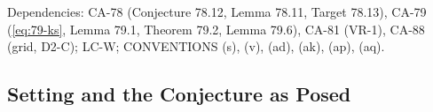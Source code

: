 Dependencies: CA-78 (Conjecture 78.12, Lemma 78.11, Target 78.13), CA-79 (\eqref{eq:79-ks}, Lemma 79.1, Theorem
79.2, Lemma 79.6), CA-81 (VR-1), CA-88 (grid, D2-C); LC-W; CONVENTIONS (s), (v), (ad), (ak), (ap), (aq).


\subsection{Setting and the Conjecture as Posed}

